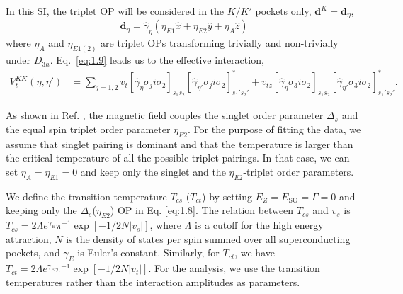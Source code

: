 \documentclass[showpacs,superscriptaddress,onecolumn,prb]{revtex4}
\begin{document}
In this SI, the triplet OP will be considered in the $K/K'$ pockets only, $\mathbf{d}^{K} = \mathbf{d}_\eta$,
\begin{equation}
\mathbf{d}_\eta=\hat{\gamma}_{\eta}\left(\eta_{E1}\hat{x}+\eta_{E2}\hat{y}+\eta_{A}\hat{z}\right)\label{eq:1.9}
\end{equation}
where $\eta_{A}$ and $\eta_{E1(2)}$ are triplet OPs transforming trivially and non-trivially under $D_{3h}$.
Eq.~\eqref{eq:1.9} leads us to the effective interaction,
\begin{align}\label{eq:1.10}
V^{KK}_t(\eta,\eta') & =
\underset{j=1,2}{\sum}v_{t}\left[\hat{\gamma}_{\eta}\sigma_{j}i\sigma_{2}\right]_{s_{1}s_{2}}\left[\hat{\gamma}_{\eta'}\sigma_{j}i\sigma_{2}\right]_{s_{1}'s_{2}'}^{*}
+v_{tz}\left[\hat{\gamma}_{\eta}\sigma_{3}i\sigma_{2}\right]_{s_{1}s_{2}}\left[\hat{\gamma}_{\eta'}\sigma_{3}i\sigma_{2}\right]_{s_{1}'s_{2}'}^{*}.
\end{align}
 
 
As shown in Ref.  \cite{Mockli2019}, the magnetic field couples the singlet order parameter $\Delta_s$ and the equal spin triplet order parameter $\eta_{E2}$.
For the purpose of fitting the data, we assume that singlet pairing is dominant and that the temperature is larger than the critical temperature of all the possible triplet pairings. In that case, we can set $\eta_A=\eta_{E1}=0$ and keep only the singlet and the $\eta_{E2}$-triplet order parameters.

 We define the transition temperature $T_{cs}$ ($T_{ct}$)
by setting $E_Z=E_{\mathrm{SO}}=\Gamma=0$ and keeping only the
$\Delta_s$($\eta_{E2}$) OP in Eq. \eqref{eq:1.8}.
The relation between $T_{cs}$ and $v_{s}$ is $T_{cs}=2\Lambda e^{\gamma_{E}}\pi^{-1}\exp\left[-1/2N\left|v_{s}\right|\right]$,
where $\Lambda$ is a cutoff for the high energy attraction, $N$ is the density of states per spin summed over all superconducting pockets, and $\gamma_{E}$
is Euler's constant. Similarly, for $T_{ct}$, we have $T_{ct}=2\Lambda e^{\gamma_{E}}\pi^{-1}\exp\left[-1/2N\left|v_{t}\right|\right]$.
For the analysis, we use the transition temperatures rather than the interaction
amplitudes as parameters.
\end{document}
